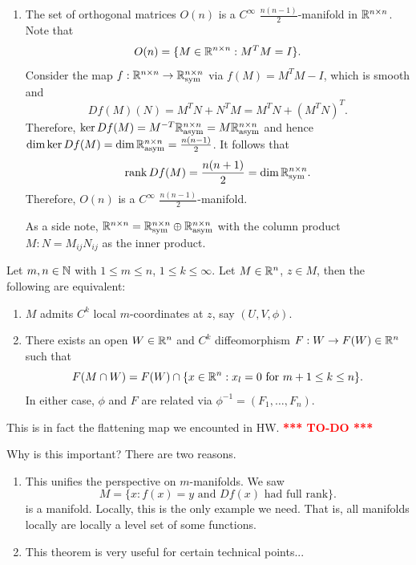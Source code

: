 \documentclass[a4paper]{article}
\newcommand{\TODO}{\textcolor{red}{\textbf{*** TO-DO ***}}}
\begin{document}
\begin{eg}
\begin{enumerate}
\item The set of orthogonal matrices $O(n)$ is a
$C^\infty$ $\frac{n (n - 1)}{2}$-manifold in $\mathbb{R}^{n \times n}$.
Note that
\[
O(n) = \{M \in \mathbb{R}^{n \times n} : M^T M = I\}.
\]
Consider the map $f : \mathbb{R}^{n \times n} \to \mathbb{R}^{n \times n}_{\text{sym}}$
via $f(M) = M^T M - I$, which is smooth and
\[
Df(M)(N) = M^T N + N^T M = M^T N + (M^T N)^T.
\]
Therefore, $\ker Df(M) = M^{-T} \mathbb{R}^{n \times n}_{\text{asym}}
= M \mathbb{R}^{n \times n}_{\text{asym}}$ and hence
$\dim \ker Df(M) = \dim \mathbb{R}^{n \times n}_{\text{asym}}
= \frac{n (n - 1)}{2}$. It follows that
\[
\operatorname{rank} Df(M) = \frac{n (n + 1)}{2} = \dim \mathbb{R}^{n \times n}_{\text{sym}}.
\]
Therefore, $O(n)$ is a $C^\infty$ $\frac{n(n-1)}{2}$-manifold.

As a side note, $\mathbb{R}^{n \times n} = \mathbb{R}^{n \times n}_{\text{sym}}
\oplus \mathbb{R}^{n \times n}_{\text{asym}}$ with the column product
$M : N = M_{ij} N_{ij}$ as the inner product.
\end{enumerate}
\end{eg}

\begin{thm}
Let $m, n \in \mathbb{N}$ with $1 \leq m \leq n$, $1 \leq k \leq \infty$.
Let $M \in \mathbb{R}^n$, $z \in M$, then the following are equivalent:
\begin{enumerate}
\item $M$ admits $C^k$ local $m$-coordinates at $z$,
say $(U, V, \phi)$.

\item There exists an open $W \in \mathbb{R}^n$ and $C^k$ diffeomorphism
$F : W \to F(W) \in \mathbb{R}^n$ such that
\[
F(M \cap W) = F(W) \cap \{x \in \mathbb{R}^n : x_l = 0 \text{ for
$m + 1 \leq k \leq n$}\}.
\]
In either case, $\phi$ and $F$ are related via
$\phi^{-1} = (F_1, \dots, F_n)$.
\end{enumerate}
\end{thm}

This is in fact the flattening map we encounted in HW. \TODO

Why is this important? There are two reasons.
\begin{enumerate}
\item This unifies the perspective on $m$-manifolds. We saw
\[
M = \{x : \text{$f(x) = y$ and $Df(x)$ had full rank}\}.
\]
is a manifold. Locally, this is the only example we need.
That is, all manifolds locally are locally a level set of
some functions.

\item This theorem is very useful for certain technical
points...
\end{enumerate}
\end{document}
